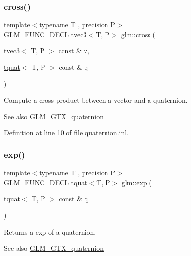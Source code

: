 \subsubsection{\texorpdfstring{cross()}{cross()}\hspace{0.1cm}{\footnotesize\ttfamily [2/2]}}
{\footnotesize\ttfamily template$<$typename T , precision P$>$ \\
\mbox{\hyperlink{setup_8hpp_ab2d052de21a70539923e9bcbf6e83a51}{G\+L\+M\+\_\+\+F\+U\+N\+C\+\_\+\+D\+E\+CL}} \mbox{\hyperlink{structglm_1_1tvec3}{tvec3}}$<$T, P$>$ glm\+::cross (\begin{DoxyParamCaption}\item[{\mbox{\hyperlink{structglm_1_1tvec3}{tvec3}}$<$ T, P $>$ const \&}]{v,  }\item[{\mbox{\hyperlink{structglm_1_1tquat}{tquat}}$<$ T, P $>$ const \&}]{q }\end{DoxyParamCaption})}

Compute a cross product between a vector and a quaternion.

\begin{DoxySeeAlso}{See also}
\mbox{\hyperlink{group__gtx__quaternion}{G\+L\+M\+\_\+\+G\+T\+X\+\_\+quaternion}} 
\end{DoxySeeAlso}


Definition at line 10 of file quaternion.\+inl.

\mbox{\label{group__gtx__quaternion_ga17295173d4c2b5ae49b84e9993b63a62}} 
\subsubsection{\texorpdfstring{exp()}{exp()}}
{\footnotesize\ttfamily template$<$typename T , precision P$>$ \\
\mbox{\hyperlink{setup_8hpp_ab2d052de21a70539923e9bcbf6e83a51}{G\+L\+M\+\_\+\+F\+U\+N\+C\+\_\+\+D\+E\+CL}} \mbox{\hyperlink{structglm_1_1tquat}{tquat}}$<$T, P$>$ glm\+::exp (\begin{DoxyParamCaption}\item[{\mbox{\hyperlink{structglm_1_1tquat}{tquat}}$<$ T, P $>$ const \&}]{q }\end{DoxyParamCaption})}

Returns a exp of a quaternion.

\begin{DoxySeeAlso}{See also}
\mbox{\hyperlink{group__gtx__quaternion}{G\+L\+M\+\_\+\+G\+T\+X\+\_\+quaternion}} 
\end{DoxySeeAlso}



